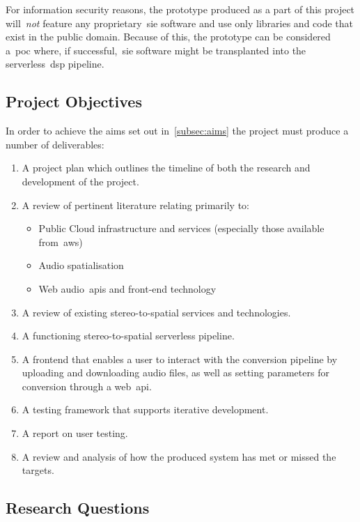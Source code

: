 For information security reasons, the prototype produced as a part of this project will~\textit{not} feature any proprietary~\gls{sie} software and use only libraries and code that exist in the public domain.
Because of this, the prototype can be considered a~\gls{poc} where, if successful,~\gls{sie} software might be transplanted into the serverless~\gls{dsp} pipeline.

\subsection{Project Objectives}\label{subsec:project-objectives}

In order to achieve the aims set out in~\ref{subsec:aims} the project must produce a number of deliverables:

\begin{enumerate}
    \item A project plan which outlines the timeline of both the research and development of the project.
    \item A review of pertinent literature relating primarily to:
    \begin{itemize}
        \item Public Cloud infrastructure and services (especially those available from~\gls{aws})
        \item Audio spatialisation
        \item Web audio~\glspl{api} and front-end technology
    \end{itemize}
    \item A review of existing stereo-to-spatial services and technologies.
    \item A functioning stereo-to-spatial serverless pipeline.
    \item A frontend that enables a user to interact with the conversion pipeline by uploading and downloading audio files, as well as setting parameters for conversion through a web~\gls{api}.
    \item A testing framework that supports iterative development.
    \item A report on user testing.
    \item A review and analysis of how the produced system has met or missed the targets.
\end{enumerate}

\subsection{Research Questions}\label{subsec:research-questions}

